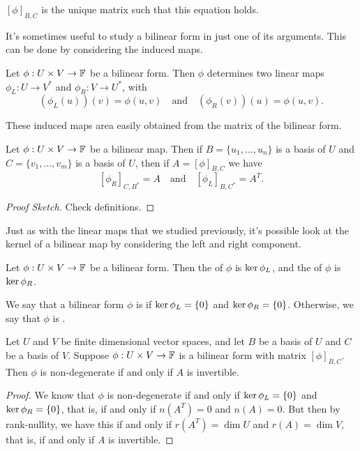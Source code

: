 \documentclass[a4paper]{scrartcl}
\begin{document}
\begin{remark}
    $[\phi]_{B, C}$ is the unique matrix such that this equation holds.
\end{remark}

It's sometimes useful to study a bilinear form in just one of its arguments. This can be done by considering the induced maps.

\begin{definition}    
    Let $\phi: U \times V \rightarrow \mathbb{F}$ be a bilinear form. Then $\phi$ determines two linear maps $\phi_L: U \rightarrow V^*$ and $\phi_R: V\rightarrow U^*$, with
    $$
    (\phi_L(u))(v) = \phi(u, v) \quad \text{and} \quad (\phi_R(v))(u) = \phi(u, v).
    $$
\end{definition}

These induced maps area easily obtained from the matrix of the bilinear form.

\begin{lemma}
    Let $\phi: U \times V \rightarrow \mathbb{F}$ be a bilinear map.
    Then if $B = \{u_1, \dots, u_n\}$ is a basis of $U$ and $C = \{v_1, \dots, v_m\}$ is a basis of $U$, then if $A = [\phi]_{B, C}$ we have
    $$
    [\phi_R]_{C, B^*} = A \quad \text{and} \quad [\phi_L]_{B, C^*} = A^T.
    $$
\end{lemma}
\begin{proof}[Proof Sketch]
    Check definitions.
\end{proof}

Just as with the linear maps that we studied previously, it's possible look at the kernel of a bilinear map by considering the left and right component.

\begin{definition}
    Let $\phi: U \times V \rightarrow \mathbb{F}$ be a bilinear form. Then the  of $\phi$ is $\operatorname{ker} \phi_L$, and the  of $\phi$ is $\operatorname{ker} \phi_R$.
\end{definition}

\begin{definition}[Degeneracy]
    We say that a bilinear form $\phi$ is  if $\operatorname{ker} \phi_L = \{0\}$ and $\operatorname{ker} \phi_R = \{0\}$. Otherwise, we say that $\phi$ is . 
\end{definition}

\begin{lemma}
    Let $U$ and $V$ be finite dimensional vector spaces, and 
let $B$ be a basis of $U$ and $C$ be a basis of $V$. 
Suppose $\phi: U \times V \rightarrow \mathbb{F}$ is a bilinear form with matrix $[\phi]_{B, C}$. Then $\phi$ is non-degenerate if and only if $A$ is invertible.
\end{lemma}
\begin{proof}
    We know that $\phi$ is non-degenerate if and only if $\operatorname{ker} \phi_L = \{0\}$ and $\operatorname{ker} \phi_R = \{0\}$, that is, if and only if $n(A^T) = 0$ and $n(A) = 0$. But then by rank-nullity, we have this if and only if $r(A^T) = \dim U$ and $r(A) = \dim V$, that is, if and only if $A$ is invertible.
\end{proof}
\end{document}
